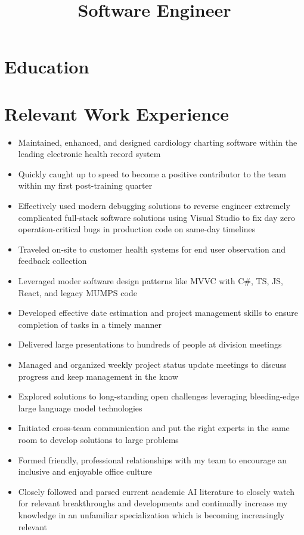 \documentclass[11pt,a4paper,sans]{moderncv}
\title{Software Engineer}
\begin{document}
\makecvtitle

\section{Education}

\section{Relevant Work Experience}
\begin{itemize}
\item Maintained, enhanced, and designed cardiology charting software within the leading electronic health record system
\item Quickly caught up to speed to become a positive contributor to the team within my first post-training quarter
\item Effectively used modern debugging solutions to reverse engineer extremely complicated full-stack software solutions using Visual Studio to fix day zero operation-critical bugs in production code on same-day timelines
\item Traveled on-site to customer health systems for end user observation and feedback collection
\item Leveraged moder software design patterns like MVVC with C\#, TS, JS, React, and legacy MUMPS code
\item Developed effective date estimation and project management skills to ensure completion of tasks in a timely manner
\item Delivered large presentations to hundreds of people at division meetings
\item Managed and organized weekly project status update meetings to discuss progress and keep management in the know
\item Explored solutions to long-standing open challenges leveraging bleeding-edge large language model technologies
\item Initiated cross-team communication and put the right experts in the same room to develop solutions to large problems
\item Formed friendly, professional relationships with my team to encourage an inclusive and enjoyable office culture
\item Closely followed and parsed current academic AI literature to closely watch for relevant breakthroughs and developments and continually increase my knowledge in an unfamiliar specialization which is becoming increasingly relevant
\end{itemize}
\end{document}
